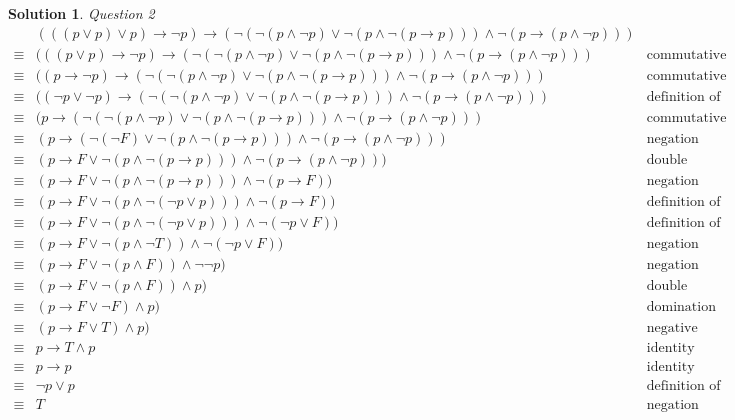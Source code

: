 \documentclass{article}
\theoremstyle{definition}
\newtheorem*{solution}{Solution}
\begin{document}
\begin{solution}
 \textit{Question 2}
 \begin{align*}
 & (((p \vee p) \vee p) \to \neg p) \to (\neg (\neg (p \wedge \neg p) \vee \neg (p \wedge \neg (p \to p))) \wedge \neg (p \to (p \wedge \neg p)))  & \text{} \\
 \equiv & (((p \vee p) \to \neg p) \to (\neg (\neg (p \wedge \neg p) \vee \neg (p \wedge \neg (p \to p))) \wedge \neg (p \to (p \wedge \neg p))) & \text{commutative} \\
 \equiv & ((p \to \neg p) \to (\neg (\neg (p \wedge \neg p) \vee \neg (p \wedge \neg (p \to p))) \wedge \neg (p \to (p \wedge \neg p))) & \text{commutative} \\
 \equiv & ((\neg p \vee \neg p) \to (\neg (\neg (p \wedge \neg p) \vee \neg (p \wedge \neg (p \to p))) \wedge \neg (p \to (p \wedge \neg p))) & \text{definition of implication} \\
 \equiv & (p \to (\neg (\neg (p \wedge \neg p) \vee \neg (p \wedge \neg (p \to p))) \wedge \neg (p \to (p \wedge \neg p))) & \text{commutative} \\
 \equiv & (p \to (\neg (\neg F) \vee \neg (p \wedge \neg (p \to p))) \wedge \neg (p \to (p \wedge \neg p))) & \text{negation} \\
 \equiv & (p \to F \vee \neg (p \wedge \neg (p \to p))) \wedge \neg (p \to (p \wedge \neg p))) & \text{double negation} \\
 \equiv & (p \to F \vee \neg (p \wedge \neg (p \to p))) \wedge \neg (p \to F)) & \text{negation laws} \\
 \equiv & (p \to F \vee \neg (p \wedge \neg (\neg p \vee p))) \wedge \neg (p \to F)) & \text{definition of implication} \\
 \equiv & (p \to F \vee \neg (p \wedge \neg (\neg p \vee p))) \wedge \neg (\neg p \vee F)) & \text{definition of implication} \\
 \equiv & (p \to F \vee \neg (p \wedge \neg T)) \wedge \neg (\neg p \vee F)) & \text{negation} \\
 \equiv & (p \to F \vee \neg (p \wedge F)) \wedge \neg \neg p) & \text{negation} \\
 \equiv & (p \to F \vee \neg (p \wedge F)) \wedge p) & \text{double negation} \\
 \equiv & (p \to F \vee \neg F) \wedge p) & \text{domination} \\
 \equiv & (p \to F \vee T) \wedge p) & \text{negative false} \\
 \equiv & p \to  T \wedge p & \text{identity} \\
 \equiv & p \to p & \text{identity} \\
 \equiv & \neg p \vee p & \text{definition of implication} \\
 \equiv & T & \text{negation} \\
 \end{align*}
 

\end{solution}
\end{document}
